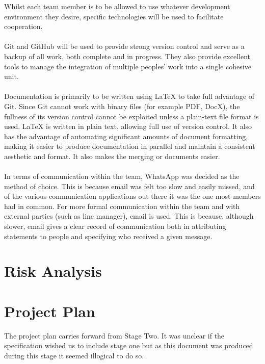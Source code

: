 \documentclass[11pt, a4paper]{report}
\begin{document}
Whilst each team member is to be allowed to use whatever development environment they desire, specific technologies will be used to facilitate cooperation.\\
\\
Git and GitHub will be used to provide strong version control and serve as a backup of all work, both complete and in progress. They also provide excellent tools to manage the integration of multiple peoples' work into a single cohesive unit.\\
\\
Documentation is primarily to be written using LaTeX to take full advantage of Git. Since Git cannot work with binary files (for example PDF, DocX), the fullness of its version control cannot be exploited unless a plain-text file format is used. LaTeX is written in plain text, allowing full use of version control. It also has the advantage of automating significant amounts of document formatting, making it easier to produce documentation in parallel and maintain a consistent aesthetic and format. It also makes the merging or documents easier.\\
\\
In terms of communication within the team, WhatsApp was decided as the method of choice. This is because email was felt too slow and easily missed, and of the various communication applications out there it was the one most members had in common. For more formal communication within the team and with external parties (such as line manager), email is used. This is because, although slower, email gives a clear record of communication both in attributing statements to people and specifying who received a given message.
\section{Risk Analysis}

\section{Project Plan}
The project plan carries forward from Stage Two. It was unclear if the specification wished us to include stage one but as this document was produced during this stage it seemed illogical to do so. 
\end{document}
